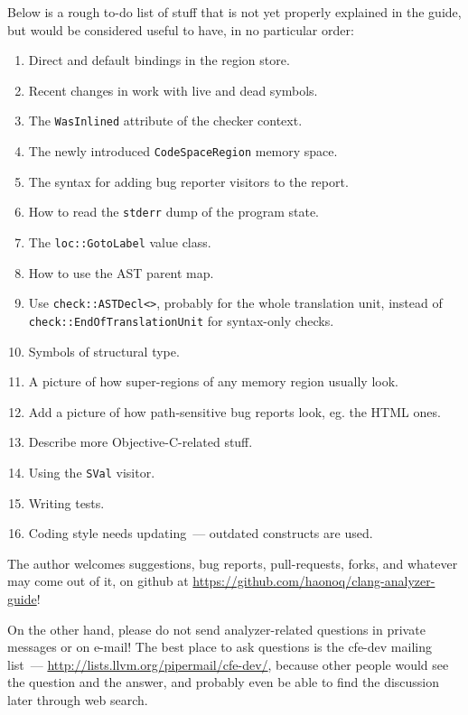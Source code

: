 \documentclass[a4paper,12pt]{article}
\begin{document}
Below is a rough to-do list of stuff that is not yet properly explained in the guide, but would be considered useful to have, in no particular order:
\begin{multicols}{2}
\begin{enumerate}
 \item Direct and default bindings in the region store.
 \item Recent changes in work with live and dead symbols.
 \item The \lstinline|WasInlined| attribute of the checker context.
 \item The newly introduced \lstinline|CodeSpaceRegion| memory space.
 \item The syntax for adding bug reporter visitors to the report.
 \item How to read the \lstinline|stderr| dump of the program state.
 \item The \lstinline|loc::GotoLabel| value class.
 \item How to use the AST parent map.
 \item Use \lstinline|check::ASTDecl<>|, probably for the whole translation unit, instead of \lstinline|check::EndOfTranslationUnit| for syntax-only checks.
 \item Symbols of structural type.
 \item A picture of how super-regions of any memory region usually look.
 \item Add a picture of how path-sensitive bug reports look, eg. the HTML ones.
 \item Describe more Objective-C-related stuff.
 \item Using the \lstinline|SVal| visitor.
 \item Writing tests.
 \item Coding style needs updating~--- outdated constructs are used.
\end{enumerate}
\end{multicols}

The author welcomes suggestions, bug reports, pull-requests, forks, and whatever may come out of it, on github at \url{https://github.com/haonoq/clang-analyzer-guide}!

On the other hand, please do not send analyzer-related questions in private messages or on e-mail! The best place to ask questions is the cfe-dev mailing list~--- \url{http://lists.llvm.org/pipermail/cfe-dev/}, because other people would see the question and the answer, and probably even be able to find the discussion later through web search.
\end{document}
